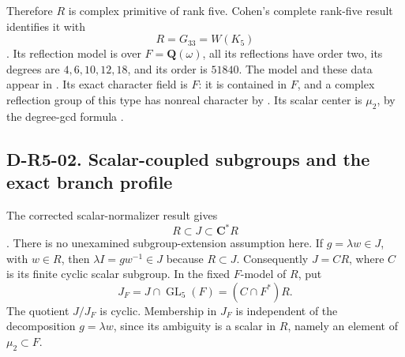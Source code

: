 Therefore $R$ is complex primitive of rank five.  Cohen's complete
rank-five result identifies it with
\[
                             R=G_{33}=W(K_5)
                                                               \tag{R5.9}
\]
\cite[\S5.10 and proof, pp.~430--432; Table~4.16, p.~412]{FIELD:Cohen}.
Its reflection model is over $F=\mathbf Q(\omega)$, all its
reflections have order two, its degrees are $4,6,10,12,18$, and
its order is $51840$.  The model and these data appear in
\cite[\S4.15, pp.~409--410; \S4.16, pp.~411--413]{FIELD:Cohen}.
Its exact character field is $F$: it is contained in $F$, and a
complex reflection group of this type has nonreal character by
\cite[\S1.4(vi) and proof, p.~382]{FIELD:Cohen}.
Its scalar center is $\mu_2$, by the degree-gcd formula
\cite[\S1.4(ii), p.~381]{FIELD:Cohen}.

\subsection*{D-R5-02. Scalar-coupled subgroups and the exact branch profile}

The corrected scalar-normalizer result gives
\[
                       R\subset J\subset\mathbf C^*R
\]
\cite[Proposition~5.14, p.~435]{FIELD:Cohen}
\cite[p.~613]{FIELD:CohenErr}.
There is no unexamined subgroup-extension assumption here.
If $g=\lambda w\in J$, with $w\in R$, then
$\lambda I=gw^{-1}\in J$ because $R\subset J$.
Consequently $J=CR$, where $C$ is its finite cyclic scalar subgroup.
In the fixed $F$-model of $R$, put
\[
                 J_F=J\cap\operatorname{GL}_5(F)
                     =(C\cap F^*)R.
                                                               \tag{R5.10}
\]
The quotient $J/J_F$ is cyclic.  Membership in $J_F$ is independent
of the decomposition $g=\lambda w$, since its ambiguity is a scalar
in $R$, namely an element of $\mu_2\subset F$.

